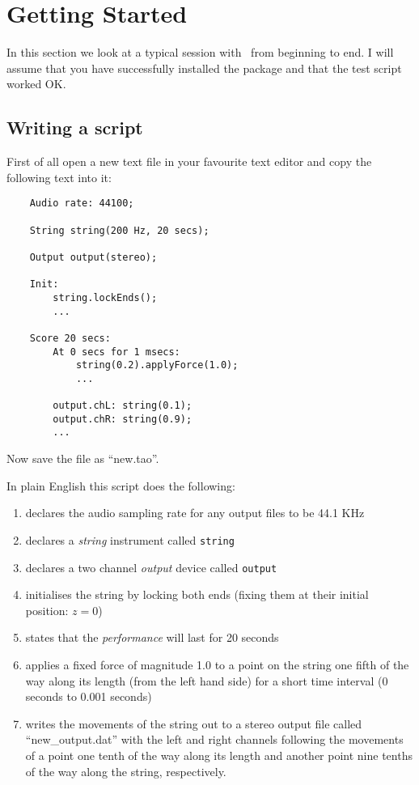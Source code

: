 \chapter{Getting Started}
\label{section:getting_started}
In this section we look at a typical session with \tao\ from beginning to
end. I will assume that you have successfully installed the package and
that the test script worked OK.

\section{Writing a script}
First of all open a new text file in your favourite text editor and copy
the following text into it:

\begin{verbatim}
    Audio rate: 44100;

    String string(200 Hz, 20 secs);

    Output output(stereo);

    Init:
        string.lockEnds();
        ...

    Score 20 secs:
        At 0 secs for 1 msecs:
            string(0.2).applyForce(1.0);
            ...

        output.chL: string(0.1);
        output.chR: string(0.9);
        ...
\end{verbatim}

Now save the file as ``new.tao''.

In plain English this script does the following:

\begin{enumerate}
\item
declares the audio sampling rate for any output files to be 44.1 KHz
\item
declares a \emph{string} instrument called \verb|string|
\item
declares a two channel \emph{output} device called \verb|output|
\item
initialises the string by locking both ends (fixing them at their
initial position: $z=0$)
\item
states that the \emph{performance} will last for 20 seconds
\item
applies a fixed force of magnitude 1.0 to a point on the string
one fifth of the way along its length (from the left hand side)
for a short time interval (0 seconds to 0.001 seconds)
\item
writes the movements of the string out to a stereo output file
called ``new\_output.dat'' with the left and right channels following
the movements of a point one tenth of the way along its length and
another point nine tenths of the way along the string, respectively.
\end{enumerate}

